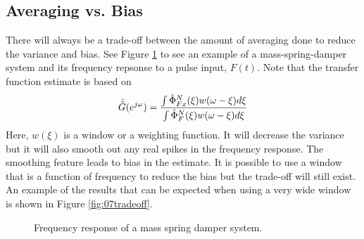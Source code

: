 \documentclass[lecture,12pt,]{pcms-l}
\begin{document}
\subsection{Averaging vs. Bias}
There will always be a trade-off between the amount of averaging done to reduce the variance and bias. See Figure \ref{fig:07msd} to see an example of a mass-spring-damper system and its frequency repsonse to a pulse input, $F(t)$. Note that the transfer function estimate is based on
$$\hat{\hat{G}}(e^{j\omega}) = \frac{\int\hat{\Phi}_{Fx}^N(\xi)w(\omega-\xi)d\xi}{\int \hat{\Phi}_F^N(\xi)w(\omega-\xi)d\xi}$$
Here, $w(\xi)$ is a window or a weighting function. It will decrease the variance but it will also smooth out any real spikes in the frequency response. The smoothing feature leads to bias in the estimate. It is possible to use a window that is a function of frequency to reduce the bias but the trade-off will still exist. An example of the results that can be expected when using a very wide window is shown in Figure \ref{fig:07tradeoff}.

\begin{figure}[ht!]
  \centering
   \hfill
   \hfill
  \caption{Frequency response of a mass spring damper system.}
  \label{fig:07msd}
\end{figure}
\end{document}
